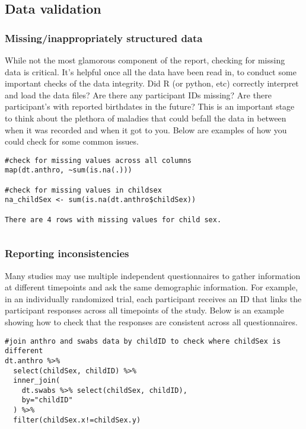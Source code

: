 \documentclass[
]{book}
\begin{document}
\hypertarget{data-validation}{%
\subsection{Data validation}\label{data-validation}}

\hypertarget{missinginappropriately-structured-data}{%
\subsubsection{Missing/inappropriately structured data}\label{missinginappropriately-structured-data}}

While not the most glamorous component of the report, checking for missing data is critical. It's helpful once all the data have been read in, to conduct some important checks of the data integrity. Did R (or python, etc) correctly interpret and load the data files? Are there any participant IDs missing? Are there participant's with reported birthdates in the future? This is an important stage to think about the plethora of maladies that could befall the data in between when it was recorded and when it got to you. Below are examples of how you could check for some common issues.

\begin{verbatim}
#check for missing values across all columns
map(dt.anthro, ~sum(is.na(.)))

#check for missing values in childsex
na_childSex <- sum(is.na(dt.anthro$childSex))

There are 4 rows with missing values for child sex.
\end{verbatim}

\(~\)

\hypertarget{reporting-inconsistencies}{%
\subsubsection{Reporting inconsistencies}\label{reporting-inconsistencies}}

Many studies may use multiple independent questionnaires to gather information at different timepoints and ask the same demographic information. For example, in an individually randomized trial, each participant receives an ID that links the participant responses across all timepoints of the study. Below is an example showing how to check that the responses are consistent across all questionnaires.

\begin{verbatim}
#join anthro and swabs data by childID to check where childSex is different
dt.anthro %>%
  select(childSex, childID) %>%
  inner_join(
    dt.swabs %>% select(childSex, childID),
    by="childID"
  ) %>%
  filter(childSex.x!=childSex.y)
\end{verbatim}
\end{document}

